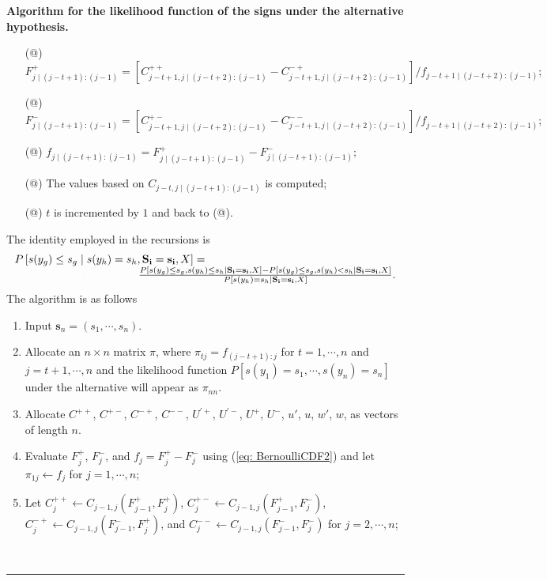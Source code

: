 \documentclass[harvard,11pt]{article}
\makeatletter
\newcommand*{\rom}[1]{\expandafter\@slowromancap\romannumeral #1@}
\newenvironment{proof}[1][Proof]{\textbf{#1.} }{\  \rule{0.5em}{0.5em}}
\makeatother
\begin{document}
\begin{proof}[Algorithm for the likelihood function of the signs under the alternative hypothesis]
\begin{itemize}
\item[(\rom{4})] $F_{j\mid (j-t+1):(j-1)}^+=\left[C_{j-t+1,j\mid(j-t+2):(j-1)}^{++}-C_{j-t+1,j\mid(j-t+2):(j-1)}^{-+}\right]/f_{j-t+1\mid(j-t+2):(j-1)};$
\item[(\rom{5})] $F_{j\mid (j-t+1):(j-1)}^-=\left[C_{j-t+1,j\mid(j-t+2):(j-1)}^{+-}-C_{j-t+1,j\mid(j-t+2):(j-1)}^{--}\right]/f_{j-t+1\mid(j-t+2):(j-1)};$
\item[(\rom{6})] $f_{j\mid (j-t+1):(j-1)}=F_{j\mid (j-t+1):(j-1)}^+-F_{j\mid (j-t+1):(j-1)}^-;$
\item[(\rom{7})] The values based on $C_{j-t,j\mid (j-t+1):(j-1)}$ is computed; 
\item[(\rom{8})] $t$ is incremented by $1$ and back to (\rom{1}).
\end{itemize}
The identity employed in the recursions is
\begingroup
\allowdisplaybreaks
\begin{align*}
\begin{array}{ll}
P\left[s(y_g)\leq s_g\mid s(y_h)=s_h,\mathbf{S_i}=\mathbf{s_i},X\right]=\\
\textcolor{white}{P[s(y_g)\leq s_g\mid s(y_h)=s_h,}\frac{P\left[s(y_g)\leq s_g, s(y_h)\leq s_h\mid\mathbf{S_i}=\mathbf{s_i},X\right]-P\left[s(y_g)\leq s_g, s(y_h)< s_h\mid\mathbf{S_i}=\mathbf{s_i},X\right]}{P\left[s(y_h)=s_h\mid \mathbf{S_i}=\mathbf{s_i},X\right]}.
\end{array}
\end{align*}
 \endgroup
The algorithm is as follows
\begin{enumerate}
\item Input $\mathbf{s}_n=\left(s_1,\cdots,s_n\right)$.
\item Allocate an $n\times n$ matrix $\pi$, where $\pi_{tj}=f_{(j-t+1):j}$ for $t=1,\cdots,n$ and $j=t+1,\cdots,n$ and the likelihood function $P[s(y_1)=s_1,\cdots,s(y_n)=s_n]$ under the alternative will appear as $\pi_{nn}$.
\item Allocate $C^{++}$, $C^{+-}$, $C^{-+}$, $C^{--}$, $U^{'+}$, $U^{'-}$, $U^{+}$, $U^{-}$, $u'$, $u$, $w'$, $w$, as vectors of length $n$.
\item Evaluate $F^{+}_j$, $F^{-}_j$, and $f_j=F^{+}_j-F^{-}_j$ using (\ref{eq: BernoulliCDF2}) and let $\pi_{1j}\leftarrow f_j$ for $j=1,\cdots,n$;  
\item Let $C^{++}_j\leftarrow C_{j-1,j}\left(F^{+}_{j-1},F^{+}_{j}\right)$, $C^{+-}_j\leftarrow C_{j-1,j}\left(F^{+}_{j-1},F^{-}_{j}\right)$, $C^{-+}_j\leftarrow C_{j-1,j}\left(F^{-}_{j-1},F^{+}_{j}\right)$, and $C^{--}_j\leftarrow C_{j-1,j}\left(F^{-}_{j-1},F^{-}_{j}\right)$ for $j=2,\cdots,n$;

\end{enumerate}
\end{proof}
\end{document}
